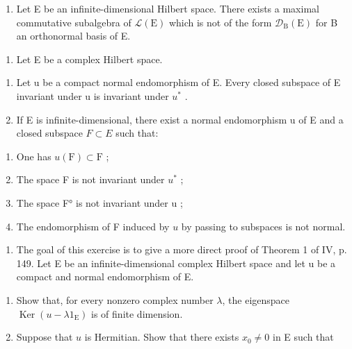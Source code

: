 \begin{enumerate}
\def\labelenumi{\alph{enumi})}
\setcounter{enumi}{1}
\tightlist
\item
  Let E be an infinite-dimensional Hilbert space. There exists a maximal commutative subalgebra of \(\mathcal{L}(\mathrm{E})\) which is not of the form \(\mathcal{D}_{\mathrm{B}}(\mathrm{E})\) for B an orthonormal basis of E.
\end{enumerate}

\begin{enumerate}
\def\labelenumi{\arabic{enumi})}
\setcounter{enumi}{5}
\tightlist
\item
  Let E be a complex Hilbert space.
\end{enumerate}

\begin{enumerate}
\def\labelenumi{\alph{enumi})}
\item
  Let u be a compact normal endomorphism of E. Every closed subspace of E invariant under u is invariant under \(u^{*}\) .
\item
  If E is infinite-dimensional, there exist a normal endomorphism u of E and a closed subspace \(F \subset E\) such that:
\end{enumerate}

\begin{enumerate}
\def\labelenumi{(\roman{enumi})}
\item
  One has \(u(\mathrm{F}) \subset \mathrm{F}\) ;
\item
  The space F is not invariant under \(u^{*}\) ;
\item
  The space F° is not invariant under u ;
\item
  The endomorphism of F induced by \(u\) by passing to subspaces is not normal.
\end{enumerate}

\begin{enumerate}
\def\labelenumi{\arabic{enumi})}
\setcounter{enumi}{6}
\tightlist
\item
  The goal of this exercise is to give a more direct proof of Theorem 1 of IV, p. 149. Let E be an infinite-dimensional complex Hilbert space and let u be a compact and normal endomorphism of E.
\end{enumerate}

\begin{enumerate}
\def\labelenumi{\alph{enumi})}
\item
  Show that, for every nonzero complex number \(\lambda\), the eigenspace \(\operatorname{Ker}(u - \lambda 1_{\mathrm{E}})\) is of finite dimension.
\item
  Suppose that \(u\) is Hermitian. Show that there exists \(x_0 \neq 0\) in E such that
\end{enumerate}

